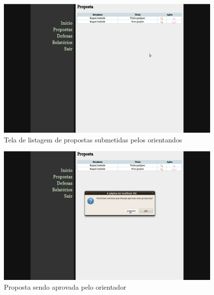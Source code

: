 \begin{figure}[htbp]
\centering
\includegraphics[width=1\textwidth]{fig/telas/processo/professor_01_aprovacao_proposta.png}
\caption{Tela de listagem de propostas submetidas pelos orientandos}
\label{fig:professor_01_aprovacao proposta}
\end{figure}

\begin{figure}[htbp]
\centering
\includegraphics[width=1\textwidth]{fig/telas/processo/professor_02_prosta_sendo_aprovada.png}
\caption{Proposta sendo aprovada pelo orientador}
\label{fig:professor_02_prosta_sendo_aprovada}
\end{figure}

